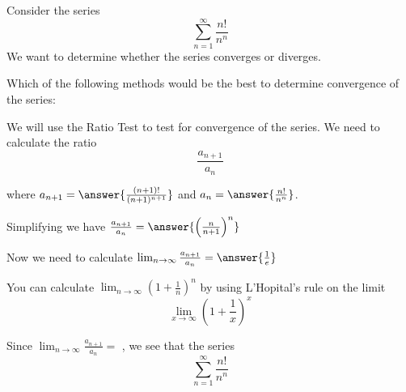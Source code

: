 \documentclass{ximera}
\author{Jason Miller}
\begin{document}
\begin{exercise}

Consider the series 
\[
\sum^{\infty}_{n=1}\frac{n!}{n^n}
\]
We want to determine whether the series converges or diverges. 


Which of the following methods would be the best to determine convergence of the series:

\begin{multipleChoice}
\end{multipleChoice}





\begin{exercise}

We will use the Ratio Test to test for convergence of the series. 
We need to calculate the ratio
\[
\frac{a_{n+1}}{a_n}
\]

where $a_{n+1}=\answer{ \frac{(n+1)!}{(n+1)^{n+1}}}$ and $a_n=\answer{\frac{n!}{n^n}}$. 

Simplifying we have $ \frac{a_{n+1}}{a_n}=\answer{  \left(\frac{n}{n+1}\right)^n}$


\begin{exercise}

Now we need to calculate $\lim_{n\to \infty}  \frac{a_{n+1}}{a_n}  =\answer{ \frac{1}{e} }$

\begin{hint}
You can calculate $\lim_{n \to \infty} \left(1+\frac{1}{n} \right)^n$ by using 
L'Hopital's rule on the limit
\[
\lim_{x \to \infty} \left( 1+\frac{1}{x} \right)^x
\]
\end{hint}

\begin{exercise}

Since $\lim_{n \to \infty} \frac{a_{n+1}}{a_n}=$  ,
we see that the series
\[
\sum^{\infty}_{n=1} \frac{n!}{n^n}
\]
\begin{multipleChoice}
\end{multipleChoice}


\end{exercise}

\end{exercise}
\end{exercise}
\end{exercise}
\end{document}
